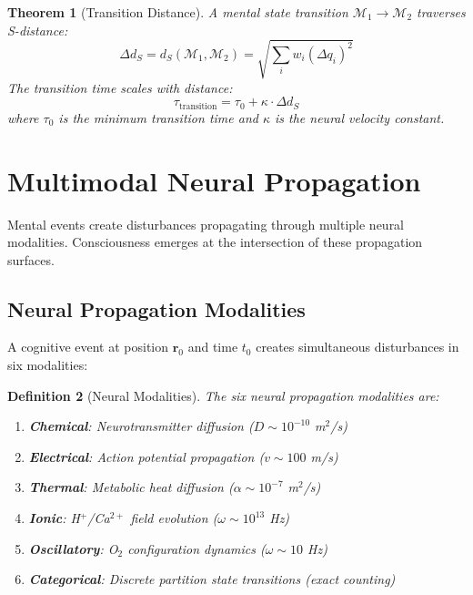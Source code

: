 \documentclass[aps,prd,twocolumn,superscriptaddress,floatfix,nofootinbib]{revtex4-2}
\newtheorem{theorem}{Theorem}[section]
\newtheorem{definition}[theorem]{Definition}
\theoremstyle{remark}
\newcommand{\Mstate}{\mathcal{M}}
\newcommand{\dS}{d_S}
\newcommand{\rxnpos}{\mathbf{r}_0}
\newcommand{\rxntime}{t_0}
\begin{document}
\begin{theorem}[Transition Distance]
\label{thm:transition_dist}
A mental state transition $\Mstate_1 \to \Mstate_2$ traverses S-distance:
\begin{equation}
\Delta \dS = \dS(\Mstate_1, \Mstate_2) = \sqrt{\sum_i w_i (\Delta q_i)^2}
\end{equation}
The transition time scales with distance:
\begin{equation}
\tau_{\text{transition}} = \tau_0 + \kappa \cdot \Delta \dS
\end{equation}
where $\tau_0$ is the minimum transition time and $\kappa$ is the neural velocity constant.
\end{theorem}

\section{Multimodal Neural Propagation}
\label{sec:multimodal}

Mental events create disturbances propagating through multiple neural modalities. Consciousness emerges at the intersection of these propagation surfaces.

\subsection{Neural Propagation Modalities}

A cognitive event at position $\rxnpos$ and time $\rxntime$ creates simultaneous disturbances in six modalities:

\begin{definition}[Neural Modalities]
\label{def:neural_modalities}
The six neural propagation modalities are:
\begin{enumerate}
\item \textbf{Chemical}: Neurotransmitter diffusion ($D \sim 10^{-10}$ m$^2$/s)
\item \textbf{Electrical}: Action potential propagation ($v \sim 100$ m/s)
\item \textbf{Thermal}: Metabolic heat diffusion ($\alpha \sim 10^{-7}$ m$^2$/s)
\item \textbf{Ionic}: H$^+$/Ca$^{2+}$ field evolution ($\omega \sim 10^{13}$ Hz)
\item \textbf{Oscillatory}: O$_2$ configuration dynamics ($\omega \sim 10$ Hz)
\item \textbf{Categorical}: Discrete partition state transitions (exact counting)
\end{enumerate}
\end{definition}
\end{document}
